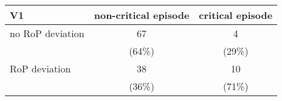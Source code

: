 \begin{table}[ht]
\centering
\begin{tabular}{l|cc}
  \hline
V1 & non-critical episode & critical episode \\ 
  \hline
no RoP deviation & 67 & 4 \\ 
   & (64\%) & (29\%) \\ 
  RoP deviation & 38 & 10 \\ 
   & (36\%) & (71\%) \\ 
   \hline
\end{tabular}
\end{table}
